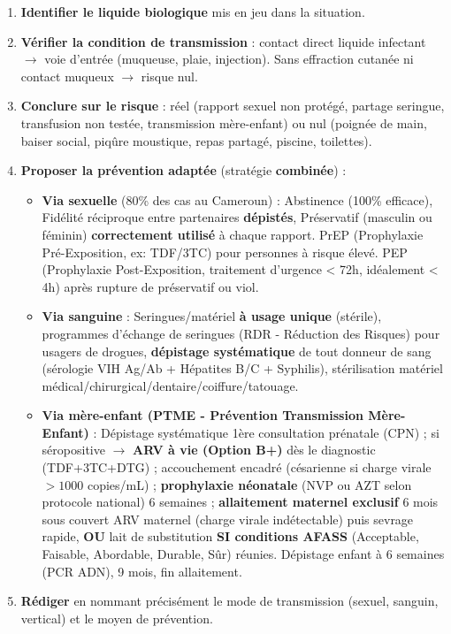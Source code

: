 \documentclass[11pt]{article}
\newcommand{\cle}[1]{{\popxbold\color{popdark}#1}}
\begin{document}
\begin{methode}
\begin{enumerate}
\item \textbf{Identifier le liquide biologique} mis en jeu dans la situation.
\item \textbf{Vérifier la condition de transmission} : contact direct liquide infectant $\rightarrow$ voie d'entrée (muqueuse, plaie, injection). Sans effraction cutanée ni contact muqueux $\rightarrow$ risque nul.
\item \textbf{Conclure sur le risque} : réel (rapport sexuel non protégé, partage seringue, transfusion non testée, transmission mère-enfant) ou nul (poignée de main, baiser social, piqûre moustique, repas partagé, piscine, toilettes).
\item \textbf{Proposer la prévention adaptée} (stratégie \textbf{combinée}) :
\begin{itemize}
\item \textbf{Via sexuelle} (80\% des cas au Cameroun) : \cle{Abstinence} (100\% efficace), \cle{Fidélité} réciproque entre partenaires \textbf{dépistés}, \cle{Préservatif} (masculin ou féminin) \textbf{correctement utilisé} à chaque rapport. \cle{PrEP} (Prophylaxie Pré-Exposition, ex: TDF/3TC) pour personnes à risque élevé. \cle{PEP} (Prophylaxie Post-Exposition, traitement d'urgence < 72h, idéalement < 4h) après rupture de préservatif ou viol.
\item \textbf{Via sanguine} : Seringues/matériel \textbf{à usage unique} (stérile), programmes d'échange de seringues (RDR - Réduction des Risques) pour usagers de drogues, \textbf{dépistage systématique} de tout donneur de sang (sérologie VIH Ag/Ab + Hépatites B/C + Syphilis), stérilisation matériel médical/chirurgical/dentaire/coiffure/tatouage.
\item \textbf{Via mère-enfant (PTME - Prévention Transmission Mère-Enfant)} : Dépistage systématique 1ère consultation prénatale (CPN) ; si séropositive $\rightarrow$ \textbf{ARV à vie (Option B+)} dès le diagnostic (TDF+3TC+DTG) ; accouchement encadré (césarienne si charge virale $> 1000$ copies/mL) ; \textbf{prophylaxie néonatale} (NVP ou AZT selon protocole national) 6 semaines ; \textbf{allaitement maternel exclusif} 6 mois sous couvert ARV maternel (charge virale indétectable) puis sevrage rapide, \textbf{OU} lait de substitution \textbf{SI conditions AFASS} (Acceptable, Faisable, Abordable, Durable, Sûr) réunies. Dépistage enfant à 6 semaines (PCR ADN), 9 mois, fin allaitement.
\end{itemize}
\item \textbf{Rédiger} en nommant précisément le mode de transmission (sexuel, sanguin, vertical) et le moyen de prévention.
\end{enumerate}
\end{methode}
\end{document}
